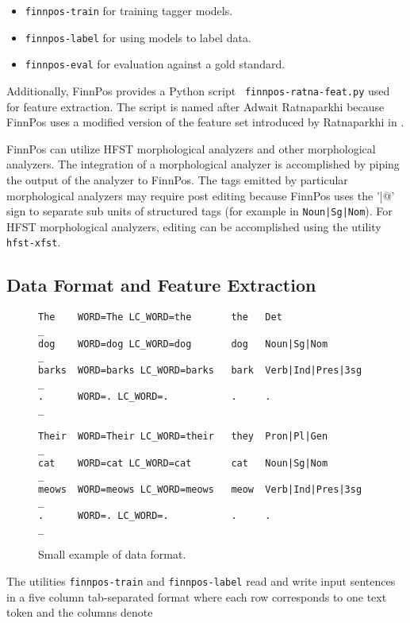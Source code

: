 \documentclass{llncs}
\begin{document}
\begin{itemize}
\item {\tt finnpos-train} for training tagger models.
\item {\tt finnpos-label} for using models to label data.
\item {\tt finnpos-eval} for evaluation against a gold standard.
\end{itemize}

Additionally, FinnPos provides a Python script {\tt
  finnpos-ratna-feat.py} used for feature extraction. The script is
named after Adwait Ratnaparkhi because FinnPos uses a modified version
of the feature set introduced by Ratnaparkhi in
\cite{ratnaparkhi/1996}.

FinnPos can utilize HFST morphological analyzers and other
morphological analyzers. The integration of a morphological analyzer
is accomplished by piping the output of the analyzer to FinnPos. The
tags emitted by particular morphological analyzers may require post
editing because FinnPos uses the '\verb@|@' sign to separate sub units
of structured tags (for example in {\tt Noun|Sg|Nom}). For HFST
morphological analyzers, editing can be accomplished using the utility
{\tt hfst-xfst}.

\subsection{Data Format and Feature Extraction}

\begin{figure}
\begin{framed}
\begin{verbatim}
The    WORD=The LC_WORD=the       the   Det                _
dog    WORD=dog LC_WORD=dog       dog   Noun|Sg|Nom        _
barks  WORD=barks LC_WORD=barks   bark  Verb|Ind|Pres|3sg  _
.      WORD=. LC_WORD=.           .     .                  _

Their  WORD=Their LC_WORD=their   they  Pron|Pl|Gen        _
cat    WORD=cat LC_WORD=cat       cat   Noun|Sg|Nom        _
meows  WORD=meows LC_WORD=meows   meow  Verb|Ind|Pres|3sg  _
.      WORD=. LC_WORD=.           .     .                  _
\end{verbatim}
\end{framed}
\caption{Small example of data format.}
\end{figure}

The utilities {\tt finnpos-train} and {\tt finnpos-label} read and write input
sentences in a five column tab-separated format where each row
corresponds to one text token and the columns denote
\end{document}
